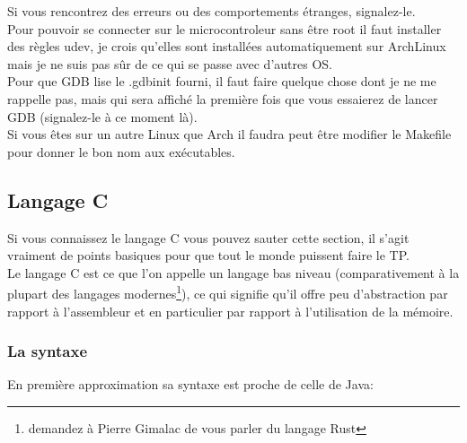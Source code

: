 \documentclass[a4paper,10pt]{article} %
\begin{document}
Si vous rencontrez des erreurs ou des comportements étranges, signalez-le.\\

Pour pouvoir se connecter sur le microcontroleur sans être root il faut installer des règles udev, je crois qu'elles sont installées automatiquement sur ArchLinux mais je ne suis pas sûr de ce qui se passe avec d'autres OS.\\

Pour que GDB lise le .gdbinit fourni, il faut faire quelque chose dont je ne me rappelle pas, mais qui sera affiché la première fois que vous essaierez de lancer GDB (signalez-le à ce moment là).\\

Si vous êtes sur un autre Linux que Arch il faudra peut être modifier le Makefile pour donner le bon nom aux exécutables.

\subsection{\label{rappels_c}Langage C}
Si vous connaissez le langage C vous pouvez sauter cette section, il s'agit vraiment de points basiques pour que tout le monde puissent faire le TP.\\

Le langage C est ce que l'on appelle un langage bas niveau (comparativement à la plupart des langages modernes\footnote{demandez à Pierre Gimalac de vous parler du langage Rust}), ce qui signifie qu'il offre peu d'abstraction par rapport à l'assembleur et en particulier par rapport à l'utilisation de la mémoire.\\

\subsubsection{La syntaxe}
En première approximation sa syntaxe est proche de celle de Java:
\end{document}
